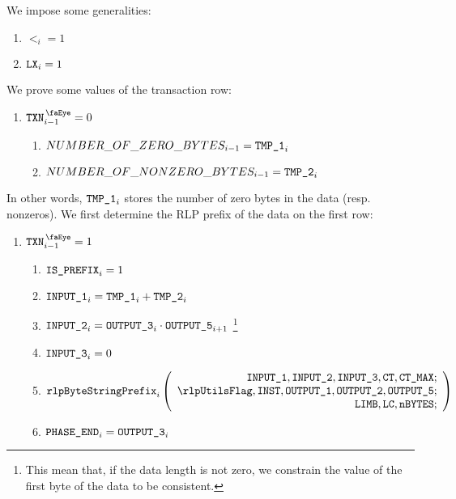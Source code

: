\begin{center}
\end{center}
We impose some generalities:
\begin{enumerate}
	\item $\lt _{i}=1$
	\item $\texttt{LX} _{i}=1$
\end{enumerate}
We prove some values of the transaction row:
\begin{enumerate}[resume]
	\item \If $\isTxn _{i - 1}=0$ \Then
		\begin{enumerate}
			\item $NUMBER\_OF\_ZERO\_BYTES _{i - 1}    = \texttt{TMP\_1} _{i}$
			\item $NUMBER\_OF\_NONZERO\_BYTES _{i - 1} = \texttt{TMP\_2} _{i}$
		\end{enumerate}
\end{enumerate}
In other words, $\texttt{TMP\_1} _{i}$ stores the number of zero bytes in the data (resp. nonzeros). 
\newline
We first determine the RLP prefix of the data on the first row:
\begin{enumerate}[resume]
	\item \If $\isTxn _{i - 1}=1$ \Then
		\begin{enumerate}
			\item $\texttt{IS\_PREFIX} _{i} = 1$
			\item $\texttt{INPUT\_1} _{i} = \texttt{TMP\_1} _{i} + \texttt{TMP\_2} _{i}$
			\item $\texttt{INPUT\_2} _{i} = \texttt{OUTPUT\_3} _{i} \cdot \texttt{OUTPUT\_5} _{i + 1}$
				\footnote{This mean that, if the data length is not zero, we constrain the value of the first byte of the data to be consistent.}
			\item $\texttt{INPUT\_3} _{i} = 0$ 
			\item 
				\[
					\rlpBytestringPrefix _{i}
					\left(
					\begin{array}{r}
						\inputColumn{1},
						\inputColumn{2},
						\inputColumn{3},
						\ct,
						\maxCt; \\
						\rlpUtilsFlag,
						\INST,
						\outputColumn{1},
						\outputColumn{2},
						\outputColumn{5}; \\
						\limb,
						\lc,
						\limbsize; \\
					\end{array}
					\right)
				\]
			\item $\texttt{PHASE\_END} _{i} = \texttt{OUTPUT\_3} _{i}$
		\end{enumerate}
\end{enumerate}
